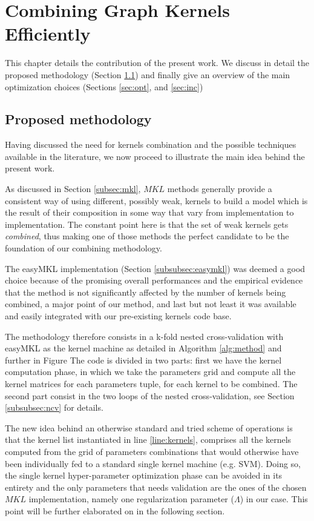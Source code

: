 \chapter{Combining Graph Kernels Efficiently}
\label{Chapter3}

This chapter details the contribution of the present work.
We discuss in detail the proposed methodology (Section \ref{sec:meth}) and
finally give an overview of the main optimization choices (Sections
\ref{sec:opt}, and \ref{sec:inc})

\section{Proposed methodology}
\label{sec:meth}

Having discussed the need for kernels combination and the possible techniques
available in the literature, we now proceed to illustrate the main idea behind
the present work.

As discussed in Section \ref{subsec:mkl}, $MKL$ methods generally provide a consistent
way of using different, possibly weak, kernels to build a model which is the result
of their composition in some way that vary from implementation to implementation.
The constant point here is that the set of weak kernels gets \emph{combined}, thus
making one of those methods the perfect candidate to be the foundation of our
combining methodology.

The easyMKL implementation (Section \ref{subsubsec:easymkl}) was deemed a good
choice because of the promising overall performances and the empirical evidence
that the method is not significantly affected by the number of kernels
being combined, a major point of our method, and last but not least it was
available and easily integrated with our pre-existing kernels code base.

The methodology therefore consists in a k-fold nested cross-validation with
easyMKL as the kernel machine as detailed in Algorithm \ref{alg:method} and further in
Figure %
The code is divided in two parts: first we have the kernel computation phase,
in which we take the parameters grid and compute all the kernel matrices for each
parameters tuple, for each kernel to be combined.
The second part consist in the two loops of the nested cross-validation, see
Section \ref{subsubsec:ncv} for details.

The new idea behind an otherwise standard and tried scheme of operations is that
the kernel list instantiated in line \ref{line:kernels}, comprises all the 
kernels computed from the grid of parameters combinations that would otherwise
have been individually fed to a standard single kernel machine (e.g. SVM).
Doing so, the single kernel hyper-parameter optimization phase can be avoided in its
entirety and the only parameters that needs validation are the ones of the chosen
$MKL$ implementation, namely one regularization parameter ($\Lambda$) in our case.
This point will be further elaborated on in the following section.

